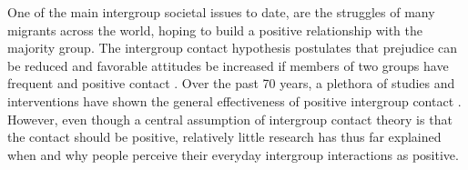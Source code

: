 \documentclass[man, 12pt, a4paper, mask]{apa7}
\theoremstyle{break}
\theoremstyle{plain}
\begin{document}
%
%
%

One of the main intergroup societal issues to date, are the struggles of many migrants across the world, hoping to build a positive relationship with the majority group. The intergroup contact hypothesis postulates that prejudice can be reduced and favorable attitudes be increased if members of two groups have frequent and positive contact \citep[e.g.,][]{Allport1954b, Hewstone1996, Pettigrew1998}. Over the past 70 years, a plethora of studies and interventions have shown the general effectiveness of positive intergroup contact \citep[e.g.,][]{Pettigrew2006}. However, even though a central assumption of intergroup contact theory is that the contact should be positive, relatively little research has thus far explained when and why people perceive their everyday intergroup interactions as positive. 
\end{document}
